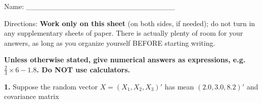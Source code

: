 \documentclass[twocolumn]{article}
\begin{document}
Name: \_\_\_\_\_\_\_\_\_\_\_\_\_\_\_\_\_\_\_\_\_\_\_\_\_\_\_\_

Directions: {\bf \Large Work only on this sheet} (on both sides, if
needed); do not turn in any supplementary sheets of paper. There is
actually plenty of room for your answers, as long as you organize
yourself BEFORE starting writing.

{\bf \Large Unless otherwise stated, give numerical answers as
expressions, e.g. $\frac{2}{3} \times 6 - 1.8$.  Do NOT use
calculators.}

{\bf 1.} Suppose the random vector $X = (X_1,X_2,X_3)'$ has mean
$(2.0,3.0,8.2)'$ and covariance matrix

\def\refto#1{\in@AmS,{#1}\if T\cresult@AmS\refto@AmS#1\end@AmS\else

  
\def\Let@AmS{\relax@AmS\iffalse{\fi\let\\=\cr\iffalse}\fi}

\begin{equation}
   \left (
   \begin{array}{ccc}
   1 & 0.4 & -0.2\\
   \  & 1 &  0.25 \\
   \  & \  & 3
   \end{array}
   \right )     
\end{equation}

\begin{itemize}

\item [(a)] (10) Fill in the three missing entries.

\item [(b)] (10) Find $Cov(X_1,X_3)$.

\item [(c)] (10) Find $\rho(X_2,X_3)$.

\item [(d)] (10) Find $Var(X_3)$.

\item [(e)] (15) Find the covariance matrix of $(X_1+X_2,X_2+X_3)'$.

\item [(f)] (15) If in addition we know that $X_1$ has a normal
distribution, find $P(1 < X_1 < 2.5)$, in terms of $\Phi()$.

\item [(g)] (15) Consider the random variable $W = X_1 + X_2$.  Which of
the following is true?
(i) $Var(W) = Var(X_1+X_2)$.
(ii) $Var(W) > Var(X_1+X_2)$.
(iii) $Var(W) < Var(X_1+X_2)$.
(iv) In order to determine which of the two variances is the larger one,
we would need to know whether the variables $X_i$ have a multivariate
normal distribution.
(v) $Var(X_1+X_2)$ doesn't exist.


\end{itemize}}
\end{document}
